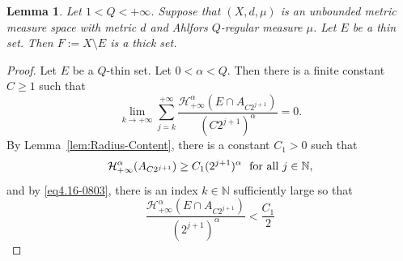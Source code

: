 \documentclass[10pt]{amsart}
\newtheorem{lemma}[theorem]{Lemma}
\numberwithin{equation}{section}
\begin{document}
	


 

\begin{lemma}\label{lem4.5-0703}
Let  $1<Q<+\infty$. 
Suppose that $(X,d,\mu)$ is an  unbounded metric measure space with metric $d$ and Ahlfors $Q$-regular measure $\mu$. Let $E$ be a thin set. Then $F:=X\setminus E$ is a thick set.
\end{lemma}
\begin{proof}
Let $E$ be a $Q$-thin set. Let $0<\alpha<Q$. Then there is a finite constant $C\geq 1$ such that 
\begin{equation}\label{eq4.16-0803}
\lim_{k\to{+\infty}}\sum_{j=k}^{+\infty}\frac{\mathcal H^{\alpha}_{+\infty}(E\cap A_{C2^{j+1}})}{(C 2^{j+1})^\alpha}=0. 
\end{equation}
By Lemma~\ref{lem:Radius-Content}, there  is a constant $C_1>0$ such that  
\begin{equation}\label{eq4.18-0803}
	\mathcal H_{+\infty}^{\alpha}( A_{C2^{j+1}})\geq C_1 (2^{j+1})^\alpha \text{\rm \ \ for all $j\in\mathbb N$},
\end{equation}
and by \eqref{eq4.16-0803}, there is an index $k\in\mathbb N$ sufficiently large so that 
\begin{equation}\label{eq4.19-0803}
	 \frac{\mathcal H^\alpha_{+\infty}(E\cap A_{C2^{j+1}})}{(2^{j+1})^\alpha}<\frac{C_1}{2}
\end{equation}

\end{proof}
\end{document}
